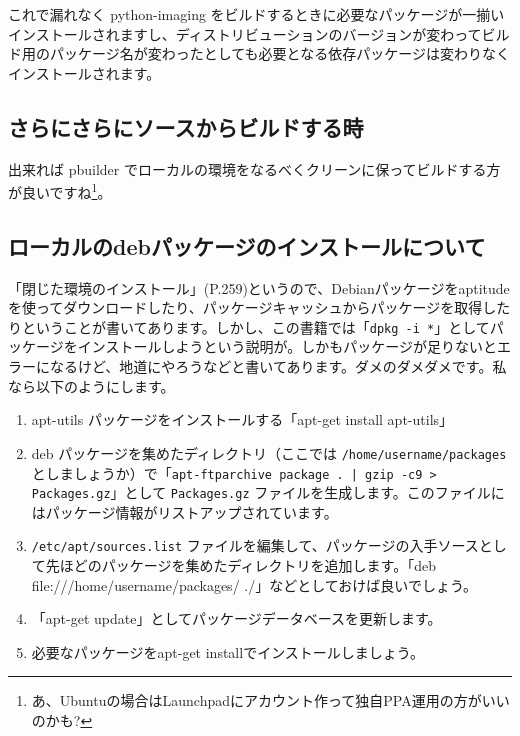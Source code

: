 \documentclass[mingoth,a4paper]{jsarticle}
\begin{document}
これで漏れなく python-imaging をビルドするときに必要なパッケージが一揃いインストールされますし、ディストリビューションのバージョンが変わってビルド用のパッケージ名が変わったとしても必要となる依存パッケージは変わりなくインストールされます。


\subsection{さらにさらにソースからビルドする時}

出来れば pbuilder でローカルの環境をなるべくクリーンに保ってビルドする方が良いですね\footnote{あ、Ubuntuの場合はLaunchpadにアカウント作って独自PPA運用の方がいいのかも?}。


\subsection{ローカルのdebパッケージのインストールについて}

「閉じた環境のインストール」(P.259)というので、Debianパッケージをaptitudeを使ってダウンロードしたり、パッケージキャッシュからパッケージを取得したりということが書いてあります。しかし、この書籍では「\texttt{dpkg -i *}」としてパッケージをインストールしようという説明が。しかもパッケージが足りないとエラーになるけど、地道にやろうなどと書いてあります。ダメのダメダメです。私なら以下のようにします。

\begin{enumerate}
 \item apt-utils パッケージをインストールする「apt-get install apt-utils」
 \item deb パッケージを集めたディレクトリ（ここでは \texttt{/home/username/packages} としましょうか）で「\texttt{apt-ftparchive package . | gzip -c9 > Packages.gz}」として \texttt{Packages.gz} ファイルを生成します。このファイルにはパッケージ情報がリストアップされています。
 \item \texttt{/etc/apt/sources.list} ファイルを編集して、パッケージの入手ソースとして先ほどのパッケージを集めたディレクトリを追加します。「deb file:///home/username/packages/ ./」などとしておけば良いでしょう。
 \item 「apt-get update」としてパッケージデータベースを更新します。
 \item 必要なパッケージをapt-get installでインストールしましょう。
\end{enumerate}
\end{document}
